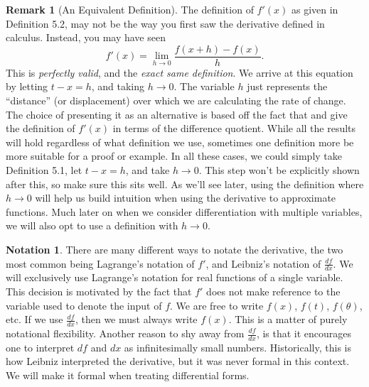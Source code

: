 \documentclass{article}
\theoremstyle{definition}
\newtheorem{note}{Notation}[section]
\newtheorem{remark}{Remark}[section]
\begin{document}
	\begin{remark}[An Equivalent Definition]
		The definition of $ f'(x) $ as given in Definition 5.2, may not be the way you first saw the derivative defined in calculus. Instead, you may have seen $$f'(x)=\lim\limits_{h\to 0}\frac{f(x+h)-f(x)}{h} .$$ This is \textit{perfectly valid}, and the \textit{exact same definition}. We arrive at this equation by letting $ t-x=h $, and taking $ h\to 0 $. The variable $ h $ just represents the ``distance'' (or displacement) over which we are calculating the rate of change. The choice of presenting it as an alternative is based off the fact that \cite{rudin1964principles} and \cite{tao2006analysis} give the definition of $ f'(x) $ in terms of the difference quotient. While all the results will hold regardless of what definition we use, sometimes one definition more be more suitable for a proof or example. In all these cases, we could simply take Definition 5.1, let $ t-x=h $, and take $ h\to 0 $. This step won't be explicitly shown after this, so make sure this sits well. As we'll see later, using the definition where $ h\to 0 $ will help us build intuition when using the derivative to approximate functions. Much later on when we consider differentiation with multiple variables, we will also opt to use a definition with $ h\to 0 $.
	\end{remark}
	\begin{note}
		There are many different ways to notate the derivative, the two most common being Lagrange's notation of $ f' $, and Leibniz's notation of $ \frac{df}{dx} $. We will exclusively use Lagrange's notation for real functions of a single variable. This decision is motivated by the fact that $ f' $ does not make reference to the variable used to denote the input of $ f $. We are free to write $ f(x) $, $ f(t) $, $ f(\theta) $, etc. If we use $ \frac{df}{dx} $, then we must always write $ f(x) $. This is a matter of purely notational flexibility. Another reason to shy away from $ \frac{df}{dx} $, is that it encourages one to interpret $ df $ and $ dx $ as infinitesimally small numbers. Historically, this is how Leibniz interpreted the derivative, but it was never formal in this context. We will make it formal when treating differential forms. 
	\end{note}
\end{document}
